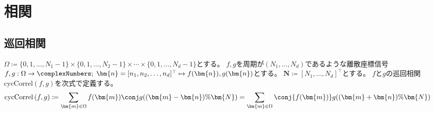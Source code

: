 \part{相関}
    \chapter{巡回相関}
        \newcommand{\cycCorrel}[2]{\mathrm{cycCorrel}\left(#1,#2\right)}
        $\Omega \coloneqq \{0,1,\dots,N_1-1\}\times\{0,1,\dots,N_2-1\}\times\cdots\times\{0,1,\dots,N_d-1\}$とする。
        $f,g$を周期が$(N_1,\dots,N_d)$であるような離散座標信号$f,g: \Omega\to\complexNumbers;\;\bm{n} = [n_1,n_2,\dots,n_d]^\top \mapsto f(\bm{n}),g(\bm{n})$とする。
        $\bm{N} \coloneqq [N_1,\dots,N_d]^\top$とする。
        $f$と$g$の巡回相関$\cycCorrel{f}{g}$を次式で定義する。
        \[ \cycCorrel{f}{g} \coloneqq \sum_{\bm{m}\in\Omega} f(\bm{m})\conj{g((\bm{m}-\bm{n})\%\bm{N})} = \sum_{\bm{m}\in\Omega} \conj{f(\bm{m})}g((\bm{m}+\bm{n})\%\bm{N}) \]